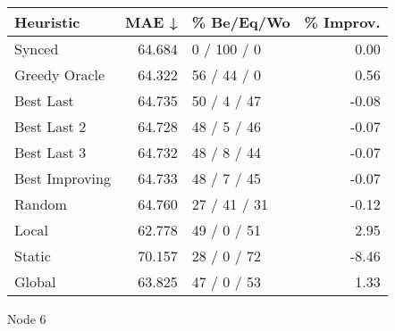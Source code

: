 \begin{tabular}{lrlr}
\toprule
\textbf{Heuristic} & \textbf{MAE ↓} & \textbf{\% Be/Eq/Wo} & \textbf{\% Improv.} \\
\midrule
            Synced &         64.684 &          0 / 100 / 0 &                0.00 \\
     Greedy Oracle &         64.322 &          56 / 44 / 0 &                0.56 \\
         Best Last &         64.735 &          50 / 4 / 47 &               -0.08 \\
       Best Last 2 &         64.728 &          48 / 5 / 46 &               -0.07 \\
       Best Last 3 &         64.732 &          48 / 8 / 44 &               -0.07 \\
    Best Improving &         64.733 &          48 / 7 / 45 &               -0.07 \\
            Random &         64.760 &         27 / 41 / 31 &               -0.12 \\
             Local &         62.778 &          49 / 0 / 51 &                2.95 \\
            Static &         70.157 &          28 / 0 / 72 &               -8.46 \\
            Global &         63.825 &          47 / 0 / 53 &                1.33 \\
\bottomrule
\end{tabular}
\caption{Node 6}
\label{tab:iid_lr01_le2_bs2_6}
